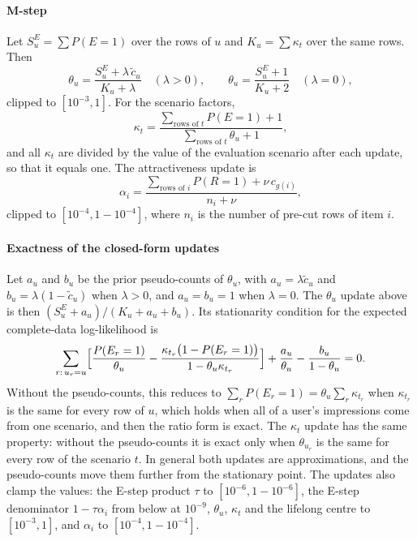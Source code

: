 \paragraph{M-step} Let $S^E_u=\sum P(E=1)$ over the rows of $u$ and $K_u=\sum\kappa_t$ over the same rows. Then
\[
\theta_u=\frac{S^E_u+\lambda\,\tilde c_u}{K_u+\lambda}\quad(\lambda>0),\qquad \theta_u=\frac{S^E_u+1}{K_u+2}\quad(\lambda=0),
\]
clipped to $[10^{-3},1]$. For the scenario factors,
\[
\kappa_t=\frac{\sum_{\text{rows of }t}P(E=1)+1}{\sum_{\text{rows of }t}\theta_{u}+1},
\]
and all $\kappa_t$ are divided by the value of the evaluation scenario after each update, so that it equals one. The attractiveness update is
\[
\alpha_i=\frac{\sum_{\text{rows of }i}P(R=1)+\nu\,c_{g(i)}}{n_i+\nu},
\]
clipped to $[10^{-4},1-10^{-4}]$, where $n_i$ is the number of pre-cut rows of item $i$.

\paragraph{Exactness of the closed-form updates} Let $a_u$ and $b_u$ be the prior pseudo-counts of $\theta_u$, with $a_u=\lambda\tilde c_u$ and
$b_u=\lambda(1-\tilde c_u)$ when $\lambda>0$, and $a_u=b_u=1$ when $\lambda=0$. The $\theta_u$ update above is then
$(S^E_u+a_u)/(K_u+a_u+b_u)$. Its stationarity condition for the expected complete-data log-likelihood is
\[
\sum_{r:\,u_r=u}\Bigl[\frac{P(E_r=1)}{\theta_u}-\frac{\kappa_{t_r}\bigl(1-P(E_r=1)\bigr)}{1-\theta_u\kappa_{t_r}}\Bigr]+\frac{a_u}{\theta_u}-\frac{b_u}{1-\theta_u}=0.
\]
Without the pseudo-counts, this reduces to $\sum_r P(E_r=1)=\theta_u\sum_r\kappa_{t_r}$ when $\kappa_{t_r}$ is the same for every row of $u$, which holds
when all of a user's impressions come from one scenario, and then the ratio form is exact. The $\kappa_t$ update has the same property: without the
pseudo-counts it is exact only when $\theta_{u_r}$ is the same for every row of the scenario $t$. In general both updates are approximations, and
the pseudo-counts move them further from the stationary point. The updates also clamp the values: the E-step product $\tau$ to
$[10^{-6},1-10^{-6}]$, the E-step denominator $1-\tau\alpha_i$ from below at $10^{-9}$, $\theta_u$, $\kappa_t$ and the lifelong centre to
$[10^{-3},1]$, and $\alpha_i$ to $[10^{-4},1-10^{-4}]$.

